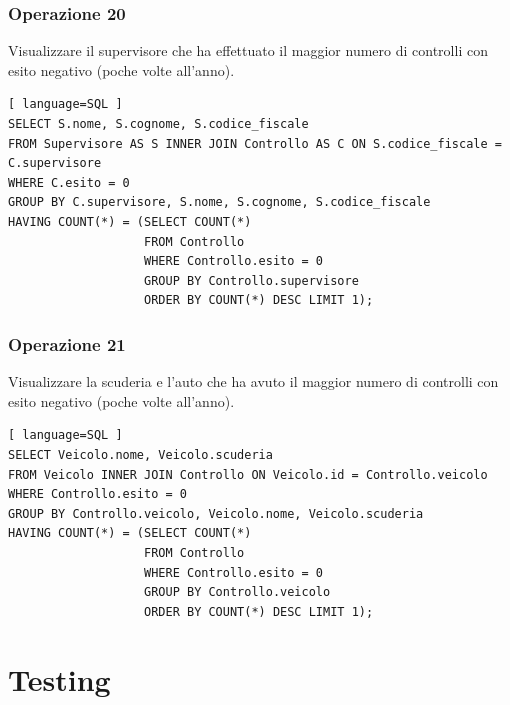 \documentclass[11pt]{article}
\begin{document}
\subsubsection{Operazione 20}
Visualizzare il supervisore che ha effettuato il maggior numero di controlli con esito negativo (poche volte all'anno).
\begin{lstlisting}[ language=SQL ]
SELECT S.nome, S.cognome, S.codice_fiscale
FROM Supervisore AS S INNER JOIN Controllo AS C ON S.codice_fiscale = C.supervisore
WHERE C.esito = 0
GROUP BY C.supervisore, S.nome, S.cognome, S.codice_fiscale
HAVING COUNT(*) = (SELECT COUNT(*)
                   FROM Controllo
                   WHERE Controllo.esito = 0
                   GROUP BY Controllo.supervisore
                   ORDER BY COUNT(*) DESC LIMIT 1);
\end{lstlisting}


\subsubsection{Operazione 21}
Visualizzare la scuderia e l'auto che ha avuto il maggior numero di controlli con esito negativo (poche volte all'anno).
\begin{lstlisting}[ language=SQL ]
SELECT Veicolo.nome, Veicolo.scuderia
FROM Veicolo INNER JOIN Controllo ON Veicolo.id = Controllo.veicolo
WHERE Controllo.esito = 0
GROUP BY Controllo.veicolo, Veicolo.nome, Veicolo.scuderia
HAVING COUNT(*) = (SELECT COUNT(*)
                   FROM Controllo
                   WHERE Controllo.esito = 0
                   GROUP BY Controllo.veicolo
                   ORDER BY COUNT(*) DESC LIMIT 1);
\end{lstlisting}


\section{Testing}
\end{document}
